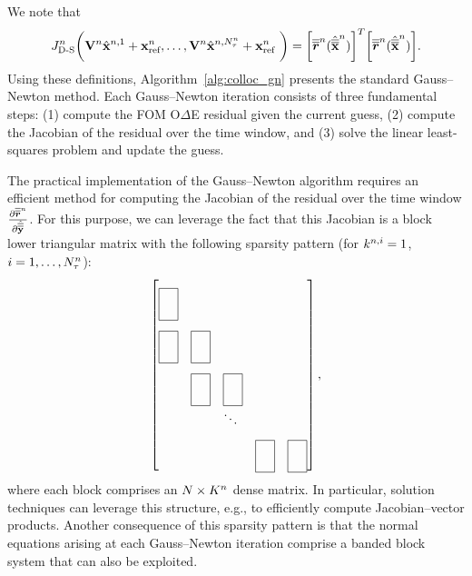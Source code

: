 We note that
\begin{equation*}
J^{n}_{\text{D-S}} \bigg( \mathbf {V}^{n} \hat{\mathbf{x}}^{n,1} + \mathbf{x}_\text{ref}^{n},\ldots,\mathbf {V}^{n} \hat{\mathbf{x}}^{n,N_{\tau}^{n}} + \mathbf{x}_\text{ref}^{n} \ \bigg) 
=
\bigg[\overline{\overline{\boldsymbol r}}^{n}_{\text{}}  (\hat{\overline{\overline{\mathbf {x}}}}^{n}) \bigg]^T \bigg[ \overline{\overline{\boldsymbol r}}^{n}_{\text{}}(\hat{\overline{\overline{\mathbf {x}}}}^{n}) \bigg].
\end{equation*} 
Using these definitions, Algorithm~\ref{alg:colloc_gn} presents the standard
Gauss--Newton method. Each Gauss--Newton iteration consists of three fundamental steps: (1)
compute the FOM O$\Delta$E residual given the current guess, (2) compute the
Jacobian of the residual over the time window, and (3) solve the linear least-squares problem and update the guess. 

The practical implementation of the Gauss--Newton algorithm requires an
efficient method for computing the Jacobian of the residual over the time
window
$\frac{\partial \overline{\overline{\boldsymbol r}}^{n}_{\text{}}}{\partial \hat{\overline{\overline{\mathbf{y}}}}^{}}$.
For this purpose, we can leverage the fact that this Jacobian is a block lower
triangular matrix with the following sparsity pattern (for $k^{n,i} = 1$,
$i=1,\ldots,N_{\tau}^{n}$): 
\begin{equation*} \begin{bmatrix*}[l]
\matshapea & \\%
 \matshapea & \matshapea & \\%
 & \matshapea  & \matshapea & \\%
&  & \ddots & \\%
 & &  & \matshapea &  \matshapea 
\end{bmatrix*},
\end{equation*}
where each block comprises an $N \times K^{n}$ dense matrix.
In particular, solution techniques can leverage this structure, e.g., to
efficiently compute Jacobian--vector products.
Another consequence of this sparsity pattern is that the normal equations
arising at each Gauss--Newton iteration 
comprise a banded block system that can also be exploited.

